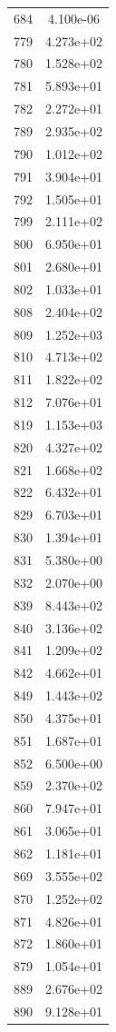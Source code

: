 \documentclass[12pt]{article}
\begin{document}
\begin{longtable}{@{}cc@{}}
684 & 4.100e-06 \\
779 & 4.273e+02 \\
780 & 1.528e+02 \\
781 & 5.893e+01 \\
782 & 2.272e+01 \\
789 & 2.935e+02 \\
790 & 1.012e+02 \\
791 & 3.904e+01 \\
792 & 1.505e+01 \\
799 & 2.111e+02 \\
800 & 6.950e+01 \\
801 & 2.680e+01 \\
802 & 1.033e+01 \\
808 & 2.404e+02 \\
809 & 1.252e+03 \\
810 & 4.713e+02 \\
811 & 1.822e+02 \\
812 & 7.076e+01 \\
819 & 1.153e+03 \\
820 & 4.327e+02 \\
821 & 1.668e+02 \\
822 & 6.432e+01 \\
829 & 6.703e+01 \\
830 & 1.394e+01 \\
831 & 5.380e+00 \\
832 & 2.070e+00 \\
839 & 8.443e+02 \\
840 & 3.136e+02 \\
841 & 1.209e+02 \\
842 & 4.662e+01 \\
849 & 1.443e+02 \\
850 & 4.375e+01 \\
851 & 1.687e+01 \\
852 & 6.500e+00 \\
859 & 2.370e+02 \\
860 & 7.947e+01 \\
861 & 3.065e+01 \\
862 & 1.181e+01 \\
869 & 3.555e+02 \\
870 & 1.252e+02 \\
871 & 4.826e+01 \\
872 & 1.860e+01 \\
879 & 1.054e+01 \\
889 & 2.676e+02 \\
890 & 9.128e+01 \\

\end{longtable}
\end{document}
